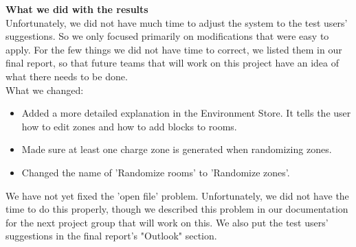 \documentclass[a4paper]{article}
\begin{document}
\textbf{What we did with the results }\\
Unfortunately, we did not have much time to adjust the system to the test users' suggestions. So we only focused primarily on modifications that were easy to apply. For the few things we did not have time to correct, we listed them in our final report, so that future teams that will work on this project have an idea of what there needs to be done. \\
What we changed:
\begin{itemize}
\item Added a more detailed explanation in the Environment Store. It tells the user how to edit zones and how to add blocks to rooms.
\item Made sure at least one charge zone is generated when randomizing zones. 
\item Changed the name of 'Randomize rooms' to 'Randomize zones'.
\end{itemize}

We have not yet fixed the 'open file' problem. Unfortunately, we did not have the time to do this properly, though we described this problem in our documentation for the next project group that will work on this. We also put the test users' suggestions in the final report's "Outlook" section.
\end{document}
